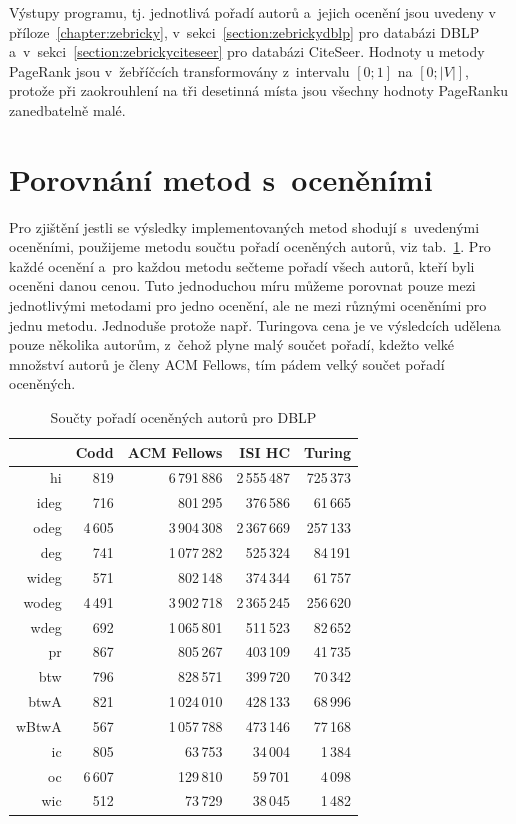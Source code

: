 \documentclass{bakalarka}
\begin{document}
Výstupy programu, tj. jednotlivá pořadí autorů a~jejich ocenění jsou uvedeny v
příloze~\ref{chapter:zebricky}, v~sekci~\ref{section:zebrickydblp} pro databázi
DBLP a~v~sekci~\ref{section:zebrickyciteseer} pro databázi CiteSeer. Hodnoty u
metody PageRank jsou v~žebříčcích transformovány z~intervalu $[0; 1]$ na $[0;
|V|]$, protože při zaokrouhlení na tři desetinná místa jsou všechny hodnoty
PageRanku zanedbatelně malé.

\section{Porovnání metod s~oceněními}
Pro zjištění jestli se výsledky implementovaných metod shodují s~uvedenými
oceněními, použijeme metodu součtu pořadí oceněných autorů, viz
tab.~\ref{tab:oceneni1}. Pro každé ocenění a~pro každou metodu sečteme pořadí
všech autorů, kteří byli oceněni danou cenou. Tuto jednoduchou míru můžeme
porovnat pouze mezi jednotlivými metodami pro jedno ocenění, ale ne mezi
různými oceněními pro jednu metodu. Jednoduše protože např. Turingova cena je
ve výsledcích udělena pouze několika autorům, z~čehož plyne malý součet pořadí,
kdežto velké množství autorů je členy ACM Fellows, tím pádem velký součet
pořadí oceněných.

\clearpage
\begin{table}[!ht]
\centering
\caption{Součty pořadí oceněných autorů pro DBLP}
\label{tab:oceneni1}
\begin{tabular}{r|rrrr}
\toprule
&Codd & ACM Fellows & ISI HC & Turing \\
\midrule
hi   & 819&6\,791\,886&2\,555\,487&725\,373\\
ideg & 716& \,801\,295& 376\,586& 61\,665\\
odeg &4\,605&3\,904\,308&2\,367\,669&257\,133\\
deg  & 741&1\,077\,282& 525\,324& 84\,191\\
wideg& 571& \,802\,148& 374\,344& 61\,757\\
wodeg&4\,491&3\,902\,718&2\,365\,245&256\,620\\
wdeg & 692&1\,065\,801& 511\,523& 82\,652\\
pr   & 867& 805\,267& 403\,109& 41\,735\\
btw  & 796& 828\,571& 399\,720& 70\,342\\
btwA & 821&1\,024\,010& 428\,133& 68\,996\\
wBtwA& 567&1\,057\,788& 473\,146& 77\,168\\
\midrule
ic\footnotemark[1]   & 805& 63\,753& 34\,004&  1\,384\\
oc\footnotemark[1]   &6\,607& 129\,810& 59\,701&4\,098\\
wic\footnotemark[1]  & 512& 73\,729& 38\,045&  1\,482\\
\bottomrule
\end{tabular}
\end{table}
\end{document}

